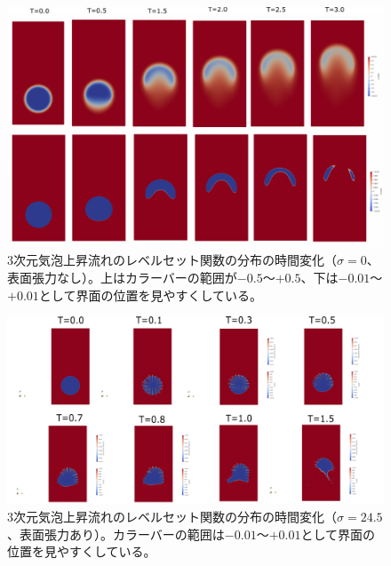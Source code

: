 \documentclass[8pt,a4paper]{article}
\begin{document}
\begin{figure}[H]
	\centering
	\includegraphics[width=18truecm]{pics/3d-bubble/levelset_t0-3.pdf}
	\caption{3次元気泡上昇流れのレベルセット関数の分布の時間変化（$\sigma=0$、表面張力なし）。上はカラーバーの範囲が$-0.5$～$+0.5$、下は$-0.01$～$+0.01$として界面の位置を見やすくしている。}
	\label{fig:3d-bubble-result_sigma0}
\end{figure}

\begin{figure}[H]
	\centering
	\includegraphics[width=18truecm]{pics/3d-bubble/result_sigma24_5.pdf}
	\caption{3次元気泡上昇流れのレベルセット関数の分布の時間変化（$\sigma=24.5$、表面張力あり）。カラーバーの範囲は$-0.01$～$+0.01$として界面の位置を見やすくしている。}
	\label{fig:3d-bubble_result_sigma24.5}
\end{figure}
\end{document}
